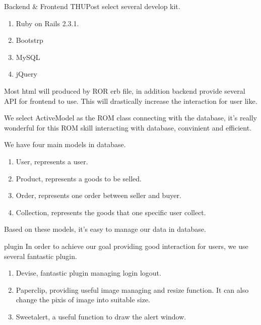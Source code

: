 \documentclass[final]{beamer}
\newlength{\onecolwid}
\begin{document}
\begin{frame}[t]
\begin{columns}[t]
\begin{column}{\onecolwid}
        \begin{block}{Backend \& Frontend}
        THUPost select several develop kit.
        \begin{enumerate}
        \item Ruby on Rails 2.3.1.
        \item Bootstrp
        \item MySQL
        \item jQuery
        \end{enumerate}

        Most html will produced by ROR erb file, in addition backend provide several API for frontend to use. This will drastically increase the interaction for user like.

        We select ActiveModel as the ROM class connecting with the database, it's really wonderful for this ROM skill interacting with database, convinient and efficient.

        We have four main models in database.
        \begin{enumerate}
        \item User, represents a user.
        \item Product, represents a goods to be selled.
        \item Order, represents one order between seller and buyer.
        \item Collection, represents the goods that one specific user collect.
        \end{enumerate}
        Based on these models, it's easy to manage our data in database.
        \end{block}

        \begin{block}{plugin}
            In order to achieve our goal providing good interaction for users, we use several fantastic plugin.
            \begin{enumerate}
            \item Devise, fantastic plugin managing login logout.
            \item Paperclip, providing useful image managing and resize function. It can also change the pixis of image into suitable size.
            \item Sweetalert, a useful function to draw the alert window.
            \end{enumerate}
        \end{block}



\end{column}
\end{columns}
\end{frame}
\end{document}
